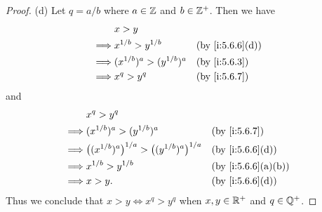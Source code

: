 \begin{proof}{(d)}
  Let \(q = a / b\) where \(a \in \mathbb{Z}\) and \(b \in \mathbb{Z}^+\).
  Then we have
  \begin{align*}
             & x > y                                              \\
    \implies & x^{1 / b} > y^{1 / b}         &  & \by{i:5.6.6}[d] \\
    \implies & (x^{1 / b})^a > (y^{1 / b})^a &  & \by{i:5.6.3}    \\
    \implies & x^q > y^q                     &  & \by{i:5.6.7}
  \end{align*}
  and
  \begin{align*}
             & x^q > y^q                                                                                \\
    \implies & (x^{1 / b})^a > (y^{1 / b})^a                                     &  & \by{i:5.6.7}      \\
    \implies & \big((x^{1 / b})^a\big)^{1 / a} > \big((y^{1 / b})^a\big)^{1 / a} &  & \by{i:5.6.6}[d]   \\
    \implies & x^{1 / b} > y^{1 / b}                                             &  & \by{i:5.6.6}[a,b] \\
    \implies & x > y.                                                            &  & \by{i:5.6.6}[d]
  \end{align*}
  Thus we conclude that \(x > y \iff x^q > y^q\) when \(x, y \in \mathbb{R}^+\) and \(q \in \mathbb{Q}^+\).
\end{proof}

